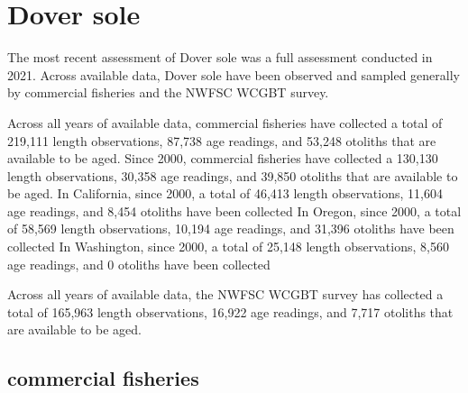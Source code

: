 \documentclass[11pt,
  english,
  letterpaper,
]{article}
\begin{document}

\hypertarget{dover-sole}{%
\section{Dover sole}\label{dover-sole}}

\leavevmode\tagmcend\tagstructend


The most recent assessment of Dover sole was a full assessment conducted in 2021. Across available data, Dover sole have been observed and sampled generally by commercial fisheries and the NWFSC WCGBT survey.

\leavevmode\tagmcend\tagstructend\par


Across all years of available data, commercial fisheries have collected a total of 219,111 length observations, 87,738 age readings, and 53,248 otoliths that are available to be aged. Since 2000, commercial fisheries have collected a 130,130 length observations, 30,358 age readings, and 39,850 otoliths that are available to be aged. In California, since 2000, a total of 46,413 length observations, 11,604 age readings, and 8,454 otoliths have been collected In Oregon, since 2000, a total of 58,569 length observations, 10,194 age readings, and 31,396 otoliths have been collected In Washington, since 2000, a total of 25,148 length observations, 8,560 age readings, and 0 otoliths have been collected

\leavevmode\tagmcend\tagstructend\par


Across all years of available data, the NWFSC WCGBT survey has collected a total of 165,963 length observations, 16,922 age readings, and 7,717 otoliths that are available to be aged.

\leavevmode\tagmcend\tagstructend\par


\hypertarget{commercial-fisheries-18}{%
\subsection{commercial fisheries}\label{commercial-fisheries-18}}
\end{document}
